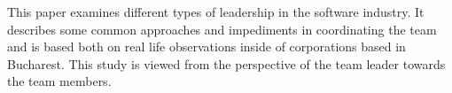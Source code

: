 
This paper examines different types of leadership in the software industry. It describes some common approaches and impediments in coordinating the team and is based both on real life observations inside of corporations based in Bucharest. This study is viewed from the perspective of the team leader towards the team members.
